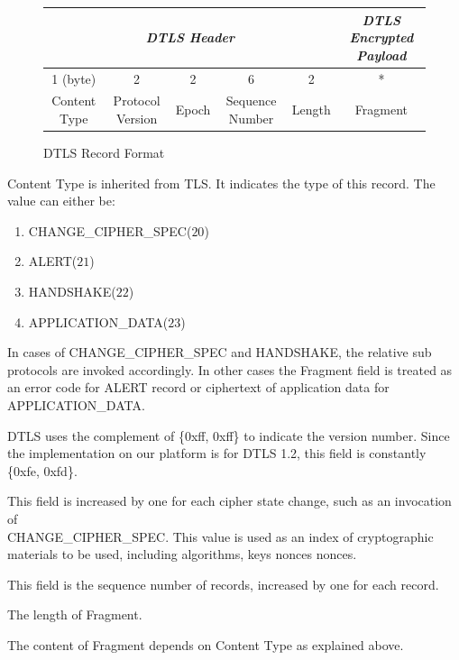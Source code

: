\begin{figure}[th!]
	\center
	\begin{tabular}{cccccc}
		\multicolumn{5}{c}{\textit{DTLS Header}}                                                                                                                                     & \textit{DTLS Encrypted Payload} \\ \hline
		\multicolumn{1}{|c|}{1 (byte)}     & \multicolumn{1}{c|}{2}                & \multicolumn{1}{c|}{2}     & \multicolumn{1}{c|}{6}               & \multicolumn{1}{c|}{2}      & \multicolumn{1}{c|}{*}          \\ \hline
		\multicolumn{1}{|c|}{Content Type} & \multicolumn{1}{c|}{Protocol Version} & \multicolumn{1}{c|}{Epoch} & \multicolumn{1}{c|}{Sequence Number} & \multicolumn{1}{c|}{Length} & \multicolumn{1}{c|}{Fragment}   \\ \hline
	\end{tabular}
	\caption{DTLS Record Format}
	\label{Fig: DTLS Record Format}
\end{figure}

\begin{description}[style=nextline]
	\item[\textbf{Content Type}]
	Content Type is inherited from TLS. It indicates the type of this record. The value can either be:
	\begin{enumerate}
		\item CHANGE\_CIPHER\_SPEC($20$)
		\item ALERT($21$)
		\item HANDSHAKE($22$)
		\item APPLICATION\_DATA($23$)
	\end{enumerate}
	In cases of CHANGE\_CIPHER\_SPEC and HANDSHAKE, the relative sub protocols are invoked accordingly. In other cases the Fragment field is treated as an error code for ALERT record or ciphertext of application data for APPLICATION\_DATA.
	\item[\textbf{Protocol Version}]
	DTLS uses the complement of \{0xff, 0xff\} to indicate the version number. Since the implementation on our platform is for DTLS 1.2, this field is constantly \{0xfe, 0xfd\}.
	\item[\textbf{Epoch}]
	This field is increased by one for each cipher state change, such as an invocation of \\
	CHANGE\_CIPHER\_SPEC. This value is used as an index of cryptographic materials to be used, including algorithms, keys nonces nonces.
	\item[\textbf{Sequence Number}]
	This field is the sequence number of records, increased by one for each record.
	\item[\textbf{Length}]
	The length of Fragment.
	\item[\textbf{Fragment}]
	The content of Fragment depends on Content Type as explained above.
\end{description}


